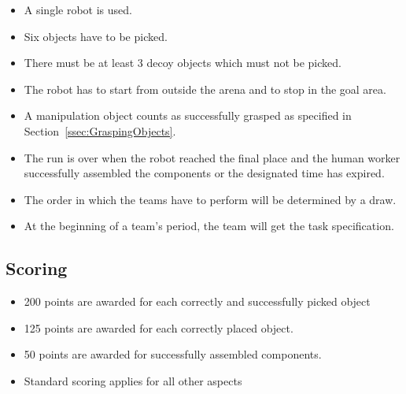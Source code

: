 \begin{itemize}
	\item A single robot is used.
	\item Six objects have to be picked.
	\item There must be at least 3 decoy objects which must not be picked.
	\item The robot has to start from outside the arena and to stop in the goal area.
	\item A manipulation object counts as successfully grasped as specified in Section~\ref{ssec:GraspingObjects}.
	\item The run is over when the robot reached the final place and the human worker successfully assembled the components or the designated time has expired.
	\item The order in which the teams have to perform will be determined by a draw.
	\item At the beginning of a team's period, the team will get the task specification.
\end{itemize}

\subsection{Scoring}
\begin{itemize}
	\item 200 points are awarded for each correctly and successfully picked object
	\item 125 points are awarded for each correctly placed object.
	\item 50 points are awarded for successfully assembled components.
	\item Standard scoring applies for all other aspects
\end{itemize}
